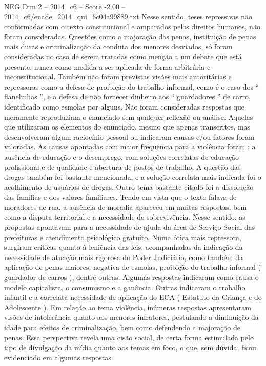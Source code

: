 \begin{textsample}{NEG Dim 2 – 2014\_c6 – Score -2.00 – 2014\_c6/enade\_2014\_qui\_6c04a99889.txt}
Nesse sentido, teses repressivas não conformadas com o texto constitucional e amparados pelos direitos humanos, não foram consideradas.
Questões como a majoração das penas, instituição de penas mais duras e criminalização da conduta dos menores desviados, só foram consideradas no caso de serem tratadas como menção a um debate que está presente, nunca como medida a ser aplicada de forma arbitrária e inconstitucional.
Também não foram previstas visões mais autoritárias e repressoras como a defesa de proibição do trabalho informal, como é o caso dos “ flanelinhas ”, e a defesa de não fornecer dinheiro aos “ guardadores ” de carro, identificado como esmolas por alguns.
Não foram consideradas respostas que meramente reproduziam o enunciado sem qualquer reflexão ou análise.
Aquelas que utilizaram os elementos do enunciado, mesmo que apenas transcritos, mas desenvolveram algum raciocínio pessoal ou indicaram causas e/ou fatores foram valoradas.
As causas apontadas com maior frequência para a violência foram : a ausência de educação e o desemprego, com soluções correlatas de educação profissional e de qualidade e abertura de postos de trabalho.
A questão das drogas também foi bastante mencionada, e a solução correlata mais indicada foi o acolhimento de usuários de drogas.
Outro tema bastante citado foi a dissolução das famílias e dos valores familiares.
Tendo em vista que o texto falava de moradores de rua, a ausência de moradia apareceu em muitas respostas, bem como a disputa territorial e a necessidade de sobrevivência.
Nesse sentido, as propostas apontavam para a necessidade de ajuda da área de Serviço Social das prefeituras e atendimento psicológico gratuito.
Numa ótica mais repressora, surgiram críticas quanto à leniência das leis, acompanhadas da indicação da necessidade de atuação mais rigorosa do Poder Judiciário, como também da aplicação de penas maiores, negativa de esmolas, proibição do trabalho informal ( guardador de carros ), dentre outras.
Algumas respostas indicaram como causa o modelo capitalista, o consumismo e a ganância.
Outras indicaram o trabalho infantil e a correlata necessidade de aplicação do ECA ( Estatuto da Criança e do Adolescente ).
Em relação ao tema violência, inúmeras respostas apresentaram visões de intolerância quanto aos menores infratores, postulando a diminuição da idade para efeitos de criminalização, bem como defendendo a majoração de penas.
Essa perspectiva revela uma cisão social, de certa forma estimulada pelo tipo de divulgação da mídia quanto aos temas em foco, o que, sem dúvida, ficou evidenciado em algumas respostas.

\end{textsample}
